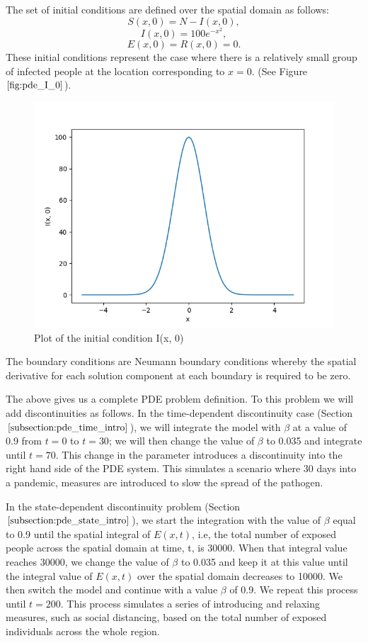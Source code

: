 \documentclass{article}
\begin{document}
The set of initial conditions are defined over the spatial domain as follows:
\begin{equation}
S(x, 0) = N - I(x, 0),
\end{equation}
\begin{equation}
I(x, 0) = 100e^{-x^2},
\end{equation}
\begin{equation}
E(x, 0) = R(x, 0) = 0.
\end{equation}
These initial conditions represent the case where there is a relatively small group of infected people at the location corresponding to $x=0$. (See Figure $\ref{fig:pde_I_0}$).

\begin{figure}[H]
\centering
\includegraphics[width=0.7\linewidth]{./figures/pde_I_0}
\caption{Plot of the initial condition I(x, 0)}
\label{fig:pde_I_0}
\end{figure}

The boundary conditions are Neumann boundary conditions whereby the spatial derivative for each solution component at each boundary is required to be zero.

The above gives us a complete PDE problem definition. To this problem we will add discontinuities as follows. 
In the time-dependent discontinuity case (Section $\ref{subsection:pde_time_intro}$), we will integrate the model with $\beta$ at a value of 0.9 from $t=0$ to $t=30$; we will then change the value of $\beta$ to 0.035 and integrate until $t=70$. This change in the parameter introduces a discontinuity into the right hand side of the PDE system. This simulates a scenario where 30 days into a pandemic, measures are introduced to slow the spread of the pathogen.

In the state-dependent discontinuity problem (Section $\ref{subsection:pde_state_intro}$), we start the integration with the value of $\beta$ equal to 0.9 until the spatial integral of $E(x, t)$, i.e, the total number of exposed people across the spatial domain at time, t, is 30000. When that integral value reaches 30000, we change the value of $\beta$ to 0.035 and keep it at this value until the integral value of $E(x, t)$ over the spatial domain decreases to 10000. We then switch the model and continue with a value $\beta$ of 0.9. We repeat this process until $t=200$. This process simulates a series of introducing and relaxing measures, such as social distancing, based on the total number of exposed individuals across the whole region.
\end{document}
